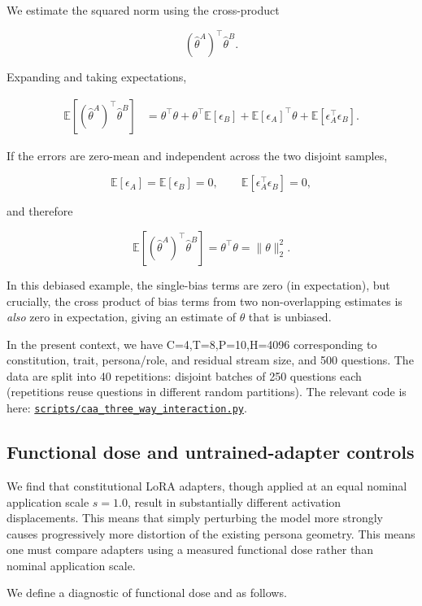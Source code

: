 \documentclass{article}
\newcommand{\provbase}{https://github.com/ukc10014/steering_across_personas/blob/main}
\DeclareRobustCommand{\provlink}[1]{\href{\provbase/#1}{\nolinkurl{#1}}}
\begin{document}
We estimate the squared norm using the cross-product

\[
\left(\hat{\theta}^{A}\right)^\top
\hat{\theta}^{B}.
\]

Expanding and taking expectations,

\[
\begin{aligned}
\mathbb{E}\left[
\left(\hat{\theta}^{A}\right)^\top
\hat{\theta}^{B}
\right]
&=
\theta^\top\theta
+ \theta^\top\mathbb{E}[\epsilon_B]
+ \mathbb{E}[\epsilon_A]^\top\theta
+ \mathbb{E}\left[\epsilon_A^\top\epsilon_B\right].
\end{aligned}
\]

If the errors are zero-mean and independent across the two disjoint
samples,

\[
\mathbb{E}[\epsilon_A]
=
\mathbb{E}[\epsilon_B]
=
0,
\qquad
\mathbb{E}\left[\epsilon_A^\top\epsilon_B\right]
=
0,
\]

and therefore

\[
\mathbb{E}\left[
\left(\hat{\theta}^{A}\right)^\top
\hat{\theta}^{B}
\right]
=
\theta^\top\theta
=
\|\theta\|_2^2.
\]

In this debiased example, the single-bias terms are zero (in expectation), but crucially, the cross product of bias terms from two non-overlapping estimates is \textit{also} zero in expectation, giving an estimate of $\theta$ that is unbiased.

In the present context, we have C=4,T=8,P=10,H=4096 corresponding to constitution, trait, persona/role, and residual stream size, and 500 questions. The data are split into 40 repetitions: disjoint batches of 250 questions each (repetitions reuse questions in different random partitions). The relevant code is here: \provlink{scripts/caa_three_way_interaction.py}.


\subsection{Functional dose and untrained-adapter controls}

We find that constitutional LoRA adapters, though applied at an equal nominal application scale $s=1.0$, result in substantially different activation displacements. This means that simply perturbing the model more strongly causes progressively more distortion of the existing persona geometry. This means one must compare adapters using a measured functional dose rather than nominal application scale.

We define a diagnostic of functional dose and as follows. 
\end{document}
